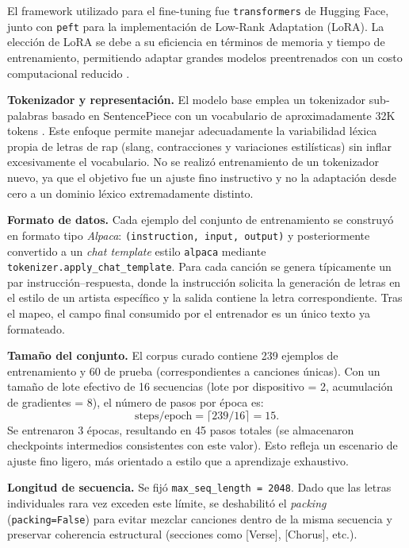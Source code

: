 \documentclass[paper=letter, fontsize=11pt, draft=false]{scrartcl}
\numberwithin{equation}{section} %
\numberwithin{figure}{section} %
\numberwithin{table}{section} %
\numberwithin{subsection}{section}
\begin{document}
El framework utilizado para el fine-tuning fue \texttt{transformers} de Hugging Face, junto con \texttt{peft} para la implementación de Low-Rank Adaptation (LoRA). La elección de LoRA se debe a su eficiencia en términos de memoria y tiempo de entrenamiento, permitiendo adaptar grandes modelos preentrenados con un costo computacional reducido \cite{hu2022lora}.

\textbf{Tokenizador y representación.} El modelo base emplea un tokenizador sub‐palabras basado en SentencePiece con un vocabulario de aproximadamente 32K tokens \cite{kudo2018sentencepiece}. Este enfoque permite manejar adecuadamente la variabilidad léxica propia de letras de rap (slang, contracciones y variaciones estilísticas) sin inflar excesivamente el vocabulario. No se realizó entrenamiento de un tokenizador nuevo, ya que el objetivo fue un ajuste fino instructivo y no la adaptación desde cero a un dominio léxico extremadamente distinto.

\textbf{Formato de datos.} Cada ejemplo del conjunto de entrenamiento se construyó en formato tipo \textit{Alpaca}: \texttt{(instruction, input, output)} y posteriormente convertido a un \emph{chat template} estilo \texttt{alpaca} mediante \texttt{tokenizer.apply\_chat\_template}. Para cada canción se genera típicamente un par instrucción–respuesta, donde la instrucción solicita la generación de letras en el estilo de un artista específico y la salida contiene la letra correspondiente. Tras el mapeo, el campo final consumido por el entrenador es un único texto ya formateado.

\textbf{Tamaño del conjunto.} El corpus curado contiene 239 ejemplos de entrenamiento y 60 de prueba (correspondientes a canciones únicas). Con un tamaño de lote efectivo de 16 secuencias (lote por dispositivo = 2, acumulación de gradientes = 8), el número de pasos por época es:
\[
\text{steps/epoch} = \lceil 239 / 16 \rceil = 15.
\]
Se entrenaron 3 épocas, resultando en 45 pasos totales (se almacenaron checkpoints intermedios consistentes con este valor). Esto refleja un escenario de ajuste fino ligero, más orientado a estilo que a aprendizaje exhaustivo.

\textbf{Longitud de secuencia.} Se fijó \texttt{max\_seq\_length = 2048}. Dado que las letras individuales rara vez exceden este límite, se deshabilitó el \emph{packing} (\texttt{packing=False}) para evitar mezclar canciones dentro de la misma secuencia y preservar coherencia estructural (secciones como [Verse], [Chorus], etc.).
\end{document}
